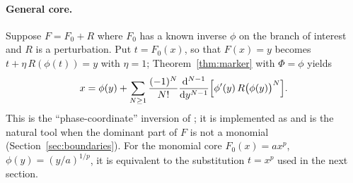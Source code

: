 \paragraph{General core.} Suppose $F=F_0+R$ where $F_0$ has a known inverse $\phi$ on the branch of interest and $R$ is a perturbation. Put $t=F_0(x)$, so that $F(x)=y$ becomes $t+\eta\,R(\phi(t))=y$ with $\eta=1$; Theorem~\ref{thm:marker} with $\Phi=\phi$ yields
\begin{equation}
 x=\phi(y)+\sum_{N\ge1}\frac{(-1)^N}{N!}\frac{\mathrm d^{N-1}}{\mathrm d y^{N-1}}\Bigl[\phi'(y)\,R\bigl(\phi(y)\bigr)^N\Bigr].
 \label{eq:general-core}
\end{equation}
This is the ``phase-coordinate'' inversion of \cite{proveit}; it is implemented as  and is the natural tool when the dominant part of $F$ is not a monomial (Section~\ref{sec:boundaries}). For the monomial core $F_0(x)=ax^p$, $\phi(y)=(y/a)^{1/p}$, it is equivalent to the substitution $t=x^p$ used in the next section.
